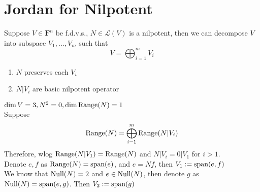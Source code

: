 \documentclass{aq-notes}
\newcommand{\Range}{\mbox{\normalfont Range}}
\newcommand{\Null}{\mbox{\normalfont Null}}
\newcommand{\Span}{\mbox{\normalfont span}}
\begin{document}
\section{Jordan for Nilpotent}
    \begin{theorem}\label{theo:jordan nilp}
        Suppose $V\in \mathbf{F}^n$ be f.d.v.s., $N\in \mathcal{L}(V)$ is a nilpotent, then we can decompose $V$ into subspace $V_1,...,V_m$ such that 
        \[ V = \bigoplus_{i=1}^m V_i\]
        \begin{enumerate}
            \item $N$ preserves each $V_i$
            \item $N\vert {V_i}$ are basic nilpotent operator
        \end{enumerate}
    \end{theorem}

    \begin{example}
        $\dim V = 3,N^2 =0, \dim \Range(N) = 1$\\
        Suppose \[\Range(N) = \bigoplus_{i=1}^m\Range(N\vert {V_i})\]
        Therefore, wlog $\Range (N\vert {V_1}) = \Range(N)$ and $N\vert {V_i} = 0\vert {V_1}$ for $i > 1$.\\
        Denote $e,f$ as $\Range (N) = \Span (e)$, and $e = Nf$, then $V_1:= \Span(e,f)$\\
        We know that $\Null (N) = 2$ and $e\in \Null(N)$, then denote $g$ as $\Null(N) = \Span(e,g)$. Then $V_2 := \Span(g)$
    \end{example}
\end{document}
